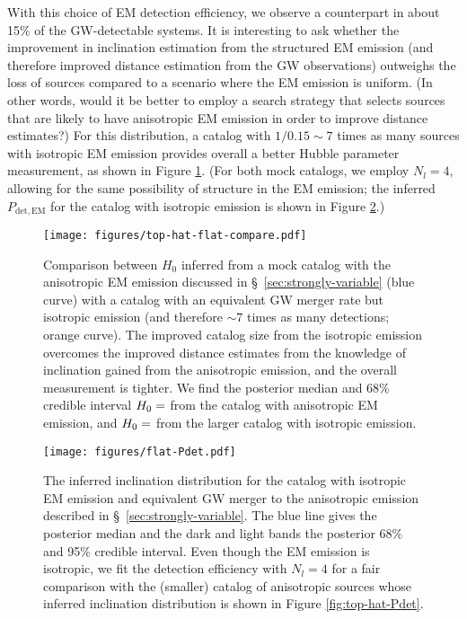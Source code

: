 \documentclass[modern]{aastex631}
\newcommand{\detected}{\mathrm{det}}
\newcommand{\EM}{\mathrm{EM}}
\begin{document}
With this choice of EM detection efficiency, we observe a counterpart in about
15\% of the GW-detectable systems.  It is interesting to ask whether the
improvement in inclination estimation from the structured EM emission (and
therefore improved distance estimation from the GW observations) outweighs the
loss of sources compared to a scenario where the EM emission is uniform.  (In
other words, would it be better to employ a search strategy that selects sources
that are likely to have anisotropic EM emission in order to improve distance
estimates?)  For this distribution, a catalog with $1/0.15 \sim 7$ times as many
sources with isotropic EM emission provides overall a better Hubble parameter
measurement, as shown in Figure \ref{fig:top-hat-flat-compare}.  (For both mock
catalogs, we employ $N_l = 4$, allowing for the same possibility of structure in
the EM emission; the inferred $P_{\detected,\EM}$ for the catalog with isotropic
emission is shown in Figure \ref{fig:flat-Pdet}.)

\begin{figure}
    \texttt{[image: figures/top-hat-flat-compare.pdf]}
    \caption{Comparison between $H_0$ inferred from a mock catalog with the
    anisotropic EM emission discussed in \S\ \ref{sec:strongly-variable} (blue
    curve) with a catalog with an equivalent GW merger rate but isotropic
    emission (and therefore $\sim 7$ times as many detections; orange curve).
    The improved catalog size from the isotropic emission overcomes the improved
    distance estimates from the knowledge of inclination gained from the
    anisotropic emission, and the overall measurement is tighter.  We find the
    posterior median and 68\% credible interval $H_0 =
    \variable{output/H0-top-hat.txt}$ from the catalog with anisotropic EM
    emission, and $H_0 = \variable{output/H0-flat-comparison.txt}$ from the
    larger catalog with isotropic emission.}
    \label{fig:top-hat-flat-compare}
\end{figure}

\begin{figure}
    \texttt{[image: figures/flat-Pdet.pdf]}
    \caption{The inferred inclination distribution for the catalog with
    isotropic EM emission and equivalent GW merger to the anisotropic emission
    described in \S\ \ref{sec:strongly-variable}.  The blue line gives the
    posterior median and the dark and light bands the posterior 68\% and 95\%
    credible interval.  Even though the EM emission is isotropic, we fit the
    detection efficiency with $N_l = 4$ for a fair comparison with the (smaller)
    catalog of anisotropic sources whose inferred inclination distribution is
    shown in Figure \ref{fig:top-hat-Pdet}.}
    \label{fig:flat-Pdet}
\end{figure}
\end{document}
